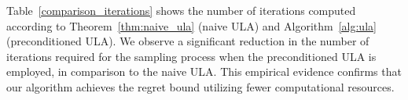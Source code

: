 \documentclass[11pt]{article}
\theoremstyle{plain}
\theoremstyle{definition}
\theoremstyle{remark}
\begin{document}
Table~\ref{comparison_iterations} shows the number of iterations computed according to Theorem~\ref{thm:naive_ula} (naive ULA) and Algorithm~\ref{alg:ula} (preconditioned ULA).
We observe a significant reduction in the number of iterations required for the sampling process when the preconditioned ULA is employed, in comparison to the naive ULA. This empirical evidence confirms that our algorithm achieves the  regret bound utilizing fewer computational resources.


%
%
\end{document}
